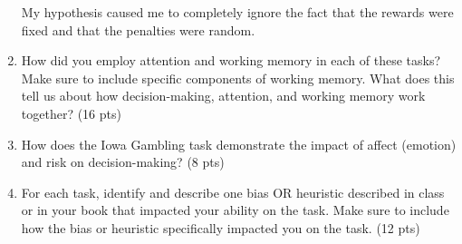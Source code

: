 \documentclass[stu,12pt,floatsintext]{apa7}
\newenvironment{solution}
  {\textit{\textbf{Solution.}}}
\newcommand{\sol}[1]{
    \begin{customframedproof}
        \begin{solution}
        #1
        \end{solution}
    \end{customframedproof}
}
\begin{document}
\begin{enumerate}
{\begin{itemize}
\begin{enumerate}
        My hypothesis caused me to completely ignore the fact that the rewards were fixed and that the penalties were random. 
      \end{enumerate} 
    \end{itemize}
     
	}

	\item How did you employ attention and working memory in each of these tasks? Make sure to include specific components of working memory. What does this tell us about how decision-making, attention, and working memory work together? (16 pts)\\[0.25cm]


	\item How does the Iowa Gambling task demonstrate the impact of affect (emotion) and risk on decision-making? (8 pts)\\[0.25cm]

	\sol{

	}

	\item For each task, identify and describe one bias OR heuristic described in class or in your book that impacted your ability on the task. Make sure to include how the bias or heuristic specifically impacted you on the task. (12 pts)\\[0.25cm]

	\sol{

	}
	
\end{enumerate}
\end{document}
